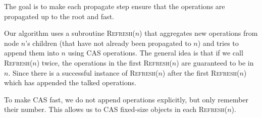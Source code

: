 \documentclass[12pt]{article}
\begin{document}
The goal is to make each propagate step ensure that the operations are propagated up to the root and fast.


Our algorithm uses a subroutine \textsc{Refresh}($n$) that aggregates new operations from node $n$'s children (that have not already been propagated to $n$) and tries to append them into $n$ using CAS operations. The general idea is that if we call \textsc{Refresh}($n$) twice, the operations in the first \textsc{Refresh}($n$) are guaranteed to be in $n$. Since there is a successful instance of \textsc{Refresh}($n$) after the first \textsc{Refresh}($n$) which has appended the talked operations.

To make CAS fast, we do not append operations explicitly, but only remember their number. This allows us to CAS fixed-size objects in each \textsc{Refresh}($n$).
\end{document}
